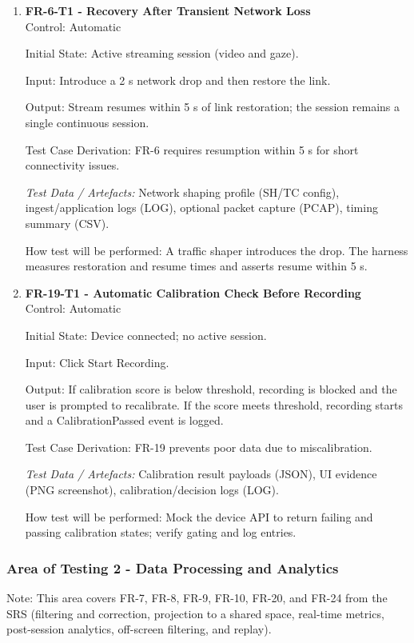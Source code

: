 \documentclass[12pt, titlepage]{article}
\begin{document}
\begin{enumerate}
\item \textbf{FR-6-T1 - Recovery After Transient Network Loss} \\

Control: Automatic

Initial State: Active streaming session (video and gaze).

Input: Introduce a 2 s network drop and then restore the link.

Output: Stream resumes within 5 s of link restoration; the session remains a single continuous session.

Test Case Derivation: FR-6 requires resumption within 5 s for short connectivity issues.

\textit{Test Data / Artefacts:} Network shaping profile (SH/TC config), ingest/application logs (LOG), optional packet capture (PCAP), timing summary (CSV).

How test will be performed: A traffic shaper introduces the drop. The harness measures restoration and resume times and asserts resume within 5 s.

\item \textbf{FR-19-T1 - Automatic Calibration Check Before Recording} \\

Control: Automatic

Initial State: Device connected; no active session.

Input: Click Start Recording.

Output: If calibration score is below threshold, recording is blocked and the user is prompted to recalibrate. If the score meets threshold, recording starts and a CalibrationPassed event is logged.

Test Case Derivation: FR-19 prevents poor data due to miscalibration.

\textit{Test Data / Artefacts:} Calibration result payloads (JSON), UI evidence (PNG screenshot), calibration/decision logs (LOG).

How test will be performed: Mock the device API to return failing and passing calibration states; verify gating and log entries.

\end{enumerate}


\subsubsection{Area of Testing 2 - Data Processing and Analytics}

Note: This area covers FR-7, FR-8, FR-9, FR-10, FR-20, and FR-24 from the SRS (filtering and correction, projection to a shared space, real-time metrics, post-session analytics, off-screen filtering, and replay).
\end{document}
